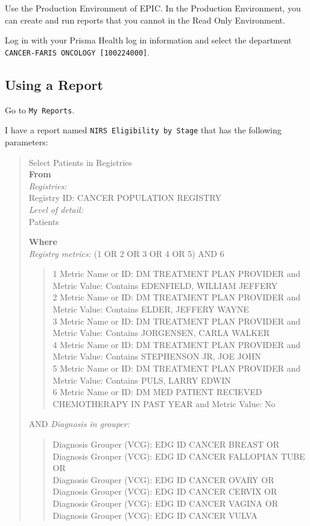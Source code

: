 \documentclass[
]{book}
\begin{document}
Use the Production Environment of EPIC. In the Production Environment, you can create and run reports that you cannot in the Read Only Environment.

Log in with your Prisma Health log in information and select the department \texttt{CANCER-FARIS\ ONCOLOGY\ {[}100224000{]}}.

\hypertarget{using-a-report}{%
\subsection{Using a Report}\label{using-a-report}}

Go to \texttt{My\ Reports}.

I have a report named \texttt{NIRS\ Eligibility\ by\ Stage} that has the following parameters:

\begin{quote}
Select Patients in Registries\\
\textbf{From}\\
\emph{Registries:}\\
Registry ID: CANCER POPULATION REGISTRY\\
\emph{Level of detail:}\\
Patients

\textbf{Where}\\
\emph{Registry metrics:} (1 OR 2 OR 3 OR 4 OR 5) AND 6\\

\begin{quote}
1 Metric Name or ID: DM TREATMENT PLAN PROVIDER and Metric Value: Contains EDENFIELD, WILLIAM JEFFERY\\
2 Metric Name or ID: DM TREATMENT PLAN PROVIDER and Metric Value: Contains ELDER, JEFFERY WAYNE\\
3 Metric Name or ID: DM TREATMENT PLAN PROVIDER and Metric Value: Contains JORGENSEN, CARLA WALKER\\
4 Metric Name or ID: DM TREATMENT PLAN PROVIDER and Metric Value: Contains STEPHENSON JR, JOE JOHN\\
5 Metric Name or ID: DM TREATMENT PLAN PROVIDER and Metric Value: Contains PULS, LARRY EDWIN\\
6 Metric Name or ID: DM MED PATIENT RECIEVED CHEMOTHERAPY IN PAST YEAR and Metric Value: No\\
\end{quote}

AND \emph{Diagnosis in grouper:}\\

\begin{quote}
Diagnosis Grouper (VCG): EDG ID CANCER BREAST OR\\
Diagnosis Grouper (VCG): EDG ID CANCER FALLOPIAN TUBE OR\\
Diagnosis Grouper (VCG): EDG ID CANCER OVARY OR\\
Diagnosis Grouper (VCG): EDG ID CANCER CERVIX OR\\
Diagnosis Grouper (VCG): EDG ID CANCER VAGINA OR\\
Diagnosis Grouper (VCG): EDG ID CANCER VULVA\\
\end{quote}


\end{quote}
\end{document}
